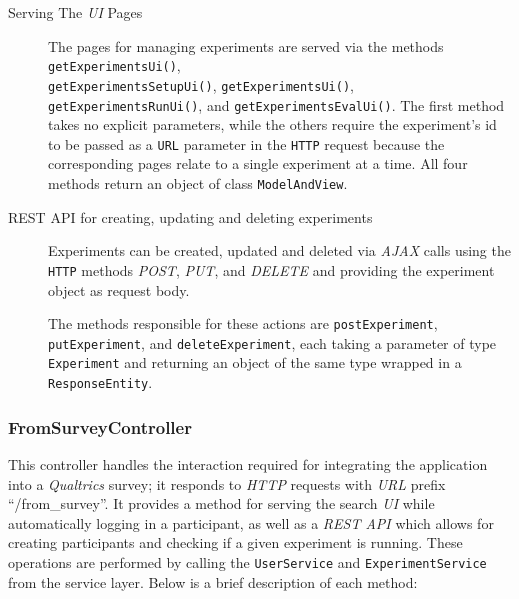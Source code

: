 \documentclass[a4paper]{usiinfbachelorproject}
\begin{document}
    \begin{description}

        \item[Serving The \emph{UI} Pages]
        The pages for managing experiments are served via the methods \texttt{getExperimentsUi()}, 
        \\ \texttt{getExperimentsSetupUi()},
        \texttt{getExperimentsUi()}, \texttt{getExperimentsRunUi()}, and \texttt{getExperimentsEvalUi()}.
        The first method takes no explicit parameters, while the others require the experiment's id to be passed as a \texttt{URL}
        parameter in the \texttt{HTTP} request because the corresponding pages relate to a single experiment at a time.
        All four methods return an object of class \texttt{ModelAndView}.

        \item[REST API for creating, updating and deleting experiments]
        Experiments can be created, updated and deleted via \emph{AJAX} calls using the \texttt{HTTP} methods
        \emph{POST}, \emph{PUT}, and \emph{DELETE} and providing the experiment object as request body.

        The methods responsible for these actions are \texttt{postExperiment}, \texttt{putExperiment}, and
        \texttt{deleteExperiment}, each taking a parameter of type \texttt{Experiment} and returning an
        object of the same type wrapped in a \texttt{ResponseEntity}.

    \end{description}

\subsubsection{\textbf{FromSurveyController}}

This controller handles the interaction required for integrating the application into a \emph{Qualtrics} survey;
it responds to \emph{HTTP} requests with \emph{URL} prefix ``/from\_survey''.
It provides a method for serving the search \emph{UI} while automatically logging in a participant, as well as
a \emph{REST API} which allows for creating participants and checking if a given experiment is running. These
operations are performed by calling the \texttt{UserService} and \texttt{ExperimentService} from
the service layer.
Below is a brief description of each method:
\end{document}

